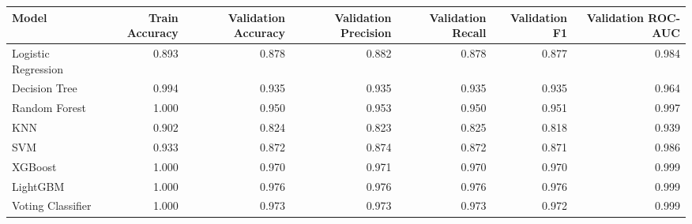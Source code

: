 \begin{tabular}{lrrrrrr}
\toprule
Model & Train Accuracy & Validation Accuracy & Validation Precision & Validation Recall & Validation F1 & Validation ROC-AUC \\
\midrule
Logistic Regression & 0.893 & 0.878 & 0.882 & 0.878 & 0.877 & 0.984 \\
Decision Tree & 0.994 & 0.935 & 0.935 & 0.935 & 0.935 & 0.964 \\
Random Forest & 1.000 & 0.950 & 0.953 & 0.950 & 0.951 & 0.997 \\
KNN & 0.902 & 0.824 & 0.823 & 0.825 & 0.818 & 0.939 \\
SVM & 0.933 & 0.872 & 0.874 & 0.872 & 0.871 & 0.986 \\
XGBoost & 1.000 & 0.970 & 0.971 & 0.970 & 0.970 & 0.999 \\
LightGBM & 1.000 & 0.976 & 0.976 & 0.976 & 0.976 & 0.999 \\
Voting Classifier & 1.000 & 0.973 & 0.973 & 0.973 & 0.972 & 0.999 \\
\bottomrule
\end{tabular}
